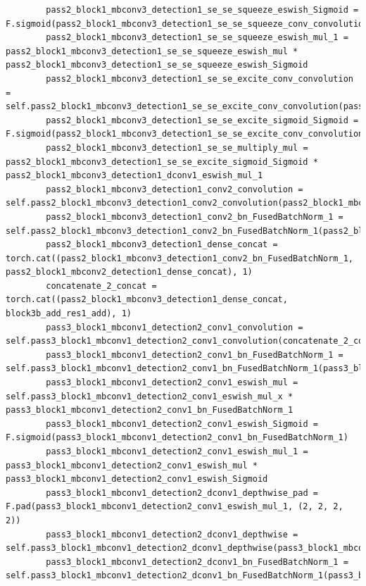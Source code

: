 \documentclass{fisatprojectfinal}
\begin{document}
\begin{appendices}
\begin{lstlisting}
        pass2_block1_mbconv3_detection1_se_se_squeeze_eswish_Sigmoid = F.sigmoid(pass2_block1_mbconv3_detection1_se_se_squeeze_conv_convolution)
        pass2_block1_mbconv3_detection1_se_se_squeeze_eswish_mul_1 = pass2_block1_mbconv3_detection1_se_se_squeeze_eswish_mul * pass2_block1_mbconv3_detection1_se_se_squeeze_eswish_Sigmoid
        pass2_block1_mbconv3_detection1_se_se_excite_conv_convolution = self.pass2_block1_mbconv3_detection1_se_se_excite_conv_convolution(pass2_block1_mbconv3_detection1_se_se_squeeze_eswish_mul_1)
        pass2_block1_mbconv3_detection1_se_se_excite_sigmoid_Sigmoid = F.sigmoid(pass2_block1_mbconv3_detection1_se_se_excite_conv_convolution)
        pass2_block1_mbconv3_detection1_se_se_multiply_mul = pass2_block1_mbconv3_detection1_se_se_excite_sigmoid_Sigmoid * pass2_block1_mbconv3_detection1_dconv1_eswish_mul_1
        pass2_block1_mbconv3_detection1_conv2_convolution = self.pass2_block1_mbconv3_detection1_conv2_convolution(pass2_block1_mbconv3_detection1_se_se_multiply_mul)
        pass2_block1_mbconv3_detection1_conv2_bn_FusedBatchNorm_1 = self.pass2_block1_mbconv3_detection1_conv2_bn_FusedBatchNorm_1(pass2_block1_mbconv3_detection1_conv2_convolution)
        pass2_block1_mbconv3_detection1_dense_concat = torch.cat((pass2_block1_mbconv3_detection1_conv2_bn_FusedBatchNorm_1, pass2_block1_mbconv2_detection1_dense_concat), 1)
        concatenate_2_concat = torch.cat((pass2_block1_mbconv3_detection1_dense_concat, block3b_add_res1_add), 1)
        pass3_block1_mbconv1_detection2_conv1_convolution = self.pass3_block1_mbconv1_detection2_conv1_convolution(concatenate_2_concat)
        pass3_block1_mbconv1_detection2_conv1_bn_FusedBatchNorm_1 = self.pass3_block1_mbconv1_detection2_conv1_bn_FusedBatchNorm_1(pass3_block1_mbconv1_detection2_conv1_convolution)
        pass3_block1_mbconv1_detection2_conv1_eswish_mul = self.pass3_block1_mbconv1_detection2_conv1_eswish_mul_x * pass3_block1_mbconv1_detection2_conv1_bn_FusedBatchNorm_1
        pass3_block1_mbconv1_detection2_conv1_eswish_Sigmoid = F.sigmoid(pass3_block1_mbconv1_detection2_conv1_bn_FusedBatchNorm_1)
        pass3_block1_mbconv1_detection2_conv1_eswish_mul_1 = pass3_block1_mbconv1_detection2_conv1_eswish_mul * pass3_block1_mbconv1_detection2_conv1_eswish_Sigmoid
        pass3_block1_mbconv1_detection2_dconv1_depthwise_pad = F.pad(pass3_block1_mbconv1_detection2_conv1_eswish_mul_1, (2, 2, 2, 2))
        pass3_block1_mbconv1_detection2_dconv1_depthwise = self.pass3_block1_mbconv1_detection2_dconv1_depthwise(pass3_block1_mbconv1_detection2_dconv1_depthwise_pad)
        pass3_block1_mbconv1_detection2_dconv1_bn_FusedBatchNorm_1 = self.pass3_block1_mbconv1_detection2_dconv1_bn_FusedBatchNorm_1(pass3_block1_mbconv1_detection2_dconv1_depthwise)

\end{lstlisting}
\end{appendices}
\end{document}
